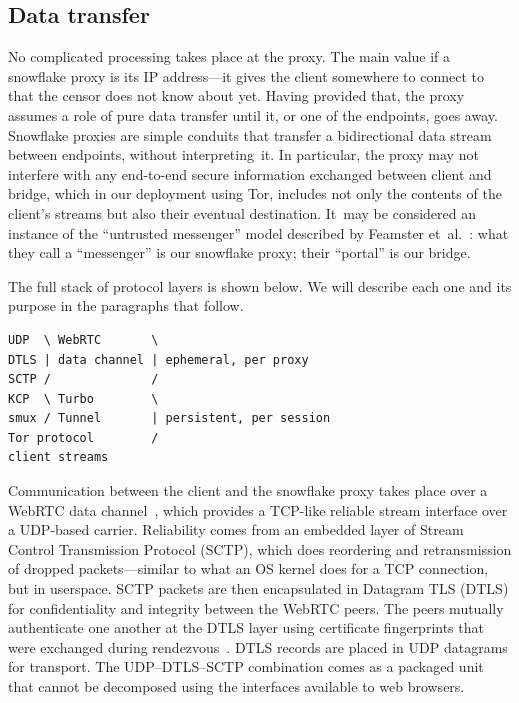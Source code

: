 \documentclass[letterpaper,twocolumn]{article}
\begin{document}
\subsection{Data transfer}
\label{sec:data-transfer}

No complicated processing takes place at the proxy.
The main value if a snowflake proxy is its IP address---it
gives the client somewhere to connect to that the censor does not know about yet.
Having provided that, the proxy assumes a role
of pure data transfer until it, or one of the endpoints, goes away.
Snowflake proxies are simple conduits that transfer
a bidirectional data stream between endpoints,
without interpreting~it.
In particular, the proxy may not interfere with any
end-to-end secure information exchanged between client and bridge,
which in our deployment using Tor,
includes not only the contents of the client's streams
but also their eventual destination.
It~may be considered an instance of the
``untrusted messenger'' model described by
Feamster et~al.~\cite[\S 3]{Feamster2003a}:
what they call a ``messenger'' is our snowflake proxy;
their ``portal'' is our bridge.

The full stack of protocol layers is shown below.
We will describe each one and its purpose
in the paragraphs that follow.

\begin{verbatim}
UDP  \ WebRTC       \
DTLS | data channel | ephemeral, per proxy
SCTP /              /
KCP  \ Turbo        \
smux / Tunnel       | persistent, per session
Tor protocol        /
client streams
\end{verbatim}

Communication between the client and the snowflake proxy
takes place over
a WebRTC data channel~\cite{rfc8831}, which
provides a TCP-like
reliable stream interface over a UDP-based carrier.
Reliability comes from an embedded layer of
Stream Control Transmission Protocol (SCTP), which
does reordering and retransmission of dropped packets---similar
to what an OS kernel does for a TCP connection,
but in userspace.
SCTP packets are then encapsulated in Datagram TLS (DTLS)
for confidentiality and integrity between the WebRTC peers.
The peers mutually authenticate one another
at the DTLS layer using certificate fingerprints
that were exchanged during rendezvous~\cite[\S 5.1]{rfc8842}.
DTLS records are placed in UDP datagrams for transport.
The UDP--DTLS--SCTP combination comes as a packaged unit
that cannot be decomposed using the interfaces available to web browsers.
\end{document}
